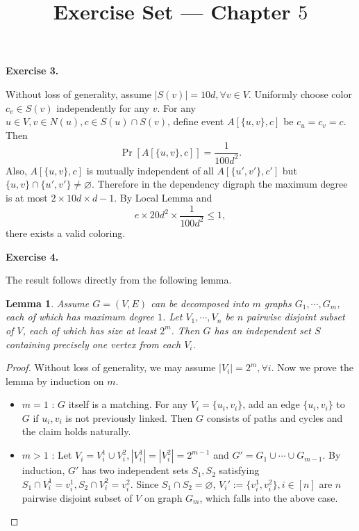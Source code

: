\documentclass[a4paper]{article}
\title{Exercise Set --- Chapter $5$}
\date{}
\newtheorem{lemma}{Lemma}
\newtheorem*{proof}{Proof}
\newenvironment{exercise}[1]{
	\par
	\noindent\textbf{Exercise #1.}\quad
}{
	\par
	\bigskip
}
\newcommand{\sbra}[1]{\left[ #1 \right]}
\begin{document}
\maketitle

\begin{exercise}{3}
    Without loss of generality, assume $|S(v)|=10d,\forall v\in V$. Uniformly choose color $c_v\in S(v)$ independently
    for any $v$. For any $u\in V,v\in N(u),c\in S(u)\cap S(v)$, define event $A[\{u,v\},c]$ be $c_u=c_v=c$. Then
    $$
    \Pr\sbra{A[\{u,v\},c]}=\frac1{100d^2}.
    $$
    Also, $A[\{u,v\},c]$ is mutually independent of all $A[\{u',v'\},c']$ but $\{u,v\}\cap\{u',v'\}\neq\varnothing$. 
    Therefore in the dependency digraph the maximum degree is at most $2\times10d\times d-1$.
    By Local Lemma and 
    $$
    e\times20d^2\times\frac1{100d^2}\leq1,
    $$
    there exists a valid coloring.
\end{exercise}

\begin{exercise}{4}
    The result follows directly from the following lemma.
    \begin{lemma}
        Assume $G=(V,E)$ can be decomposed into $m$ graphs $G_1,\cdots,G_m$, each of which has maximum degree $1$.
        Let $V_1,\cdots,V_n$ be $n$ pairwise disjoint subset of $V$, each of which has size at least $2^m$.
        Then $G$ has an independent set $S$ containing precisely one vertex from each $V_i$.
    \end{lemma}
    \begin{proof}
        Without loss of generality, we may assume $|V_i|=2^m,\forall i$.
        Now we prove the lemma by induction on $m$.
        \begin{itemize}
            \item $m=1$ : $G$ itself is a matching. For any $V_i=\{u_i,v_i\}$, add an edge $\{u_i,v_i\}$ to $G$ if $u_i,v_i$
                is not previously linked. Then $G$ consists of paths and cycles and the claim holds naturally.
            \item $m>1$ : Let $V_i=V_i^1\cup V_i^2,|V_i^1|=|V_i^2|=2^{m-1}$ and $G'=G_1\cup\cdots\cup G_{m-1}$.
                By induction, $G'$ has two independent sets $S_1,S_2$ satisfying $S_1\cap V_i^1=v_i^1,S_2\cap V_i^2=v_i^2$.
                Since $S_1\cap S_2=\varnothing$, $V_i':=\{v_i^1,v_i^2\},i\in[n]$ are $n$ pairwise disjoint subset of $V$ on
                graph $G_m$, which falls into the above case.
        \end{itemize}
    \end{proof}
\end{exercise}
\end{document}
